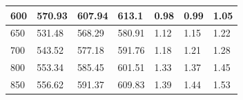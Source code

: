 \begin{table}[H]
\begin{tabular}{|l|l|l|l|l|l|l|}
600              & 570.93               & 607.94               & 613.1                & 0.98              & 0.99              & 1.05              \\ \hline
650              & 531.48               & 568.29               & 580.91               & 1.12              & 1.15              & 1.22              \\ \hline
700              & 543.52               & 577.18               & 591.76               & 1.18              & 1.21              & 1.28              \\ \hline
800              & 553.34               & 585.45               & 601.51               & 1.33              & 1.37              & 1.45              \\ \hline
850              & 556.62               & 591.37               & 609.83               & 1.39              & 1.44              & 1.53              \\ \hline
\end{tabular}
\end{table}